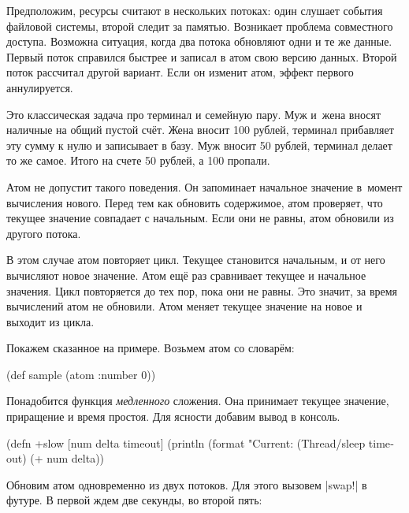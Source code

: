 Предположим, ресурсы считают в нескольких потоках: один слушает события файловой
системы, второй следит за памятью. Возникает проблема совместного
доступа. Возможна ситуация, когда два потока обновляют одни и те же
данные. Первый поток справился быстрее и записал в атом свою версию
данных. Второй поток рассчитал другой вариант. Если он изменит атом, эффект
первого аннулируется.


Это классическая задача про терминал и семейную пару. Муж и~жена вносят наличные
на общий пустой счёт. Жена вносит 100 рублей, терминал прибавляет эту сумму к
нулю и записывает в базу. Муж вносит 50 рублей, терминал делает то же
самое. Итого на счете 50 рублей, а 100 пропали.

Атом не допустит такого поведения. Он запоминает начальное значение в~момент
вычисления нового. Перед тем как обновить содержимое, атом проверяет, что
текущее значение совпадает с начальным. Если они не равны, атом обновили из
другого потока.

В этом случае атом повторяет цикл. Текущее становится начальным, и от него
вычисляют новое значение. Атом ещ\"{е} раз сравнивает текущее и начальное
значения. Цикл повторяется до тех пор, пока они не равны. Это значит, за время
вычислений атом не обновили. Атом меняет текущее значение на новое и выходит из
цикла.

Покажем сказанное на примере. Возьмем атом со словар\"{е}м:

\begin{english}
  \begin{clojure}
(def sample (atom {:number 0}))
  \end{clojure}
\end{english}

Понадобится функция \emph{медленного} сложения. Она принимает текущее значение,
приращение и время простоя. Для ясности добавим вывод в консоль.

\begin{english}
  \begin{clojure}
(defn +slow
  [num delta timeout]
  (println (format "Current: %
  (Thread/sleep timeout)
  (+ num delta))
  \end{clojure}
\end{english}


Обновим атом одновременно из двух потоков. Для этого вызовем \spverb|swap!| в
футуре. В первой ждем две секунды, во второй пять:

